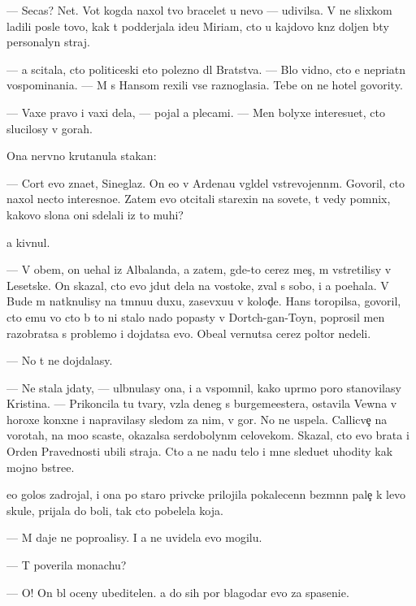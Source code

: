 \documentclass[10pt]{book}
\begin{document}
— Se{\y}cas? Net. Vot kogda naxol tvo{\y} bracelet u nevo — udivilsa. V{\yi} ne slixkom ladili posle tovo, kak t{\yi} podderjala ide{\y}u Miriam, cto u kajdovo kn{\ia}z{\ia} doljen b{\yi}ty personalyn{\yi}{\y} straj.

— {\Y}a scitala, cto politiceski eto polezno dl{\ia} Bratstva. — B{\yi}lo vidno, cto {\y}e{\y} nepri{\y}atn{\yi} vospominani{\y}a. — M{\yi} s Hansom rexili vse raznoglasi{\y}a. Tebe on ne hotel govority.

— Vaxe pravo i vaxi dela, — pojal {\y}a plecami. — Men{\ia} bolyxe interesu{\y}et, cto slucilosy v gorah.

Ona nervno krutanula stakan:

— Cort {\y}evo zna{\y}et, Sineglaz{\yi}{\y}. On {\y}e{\x}o v Ardenau v{\yi}gl{\ia}del vstrevojenn{\yi}m. Govoril, cto naxol necto interesno{\y}e. Zatem {\y}evo otcitali stare{\y}xin{\yi} na sovete, t{\yi} vedy pomnix, kakovo slona oni sdelali iz to{\y} muhi?

{\Y}a kivnul.

— V ob{\x}em, on u{\y}ehal iz Albalanda, a zatem, gde-to cerez mes{\ia}{\c}, m{\yi} vstretilisy v Lesetske. On skazal, cto {\y}evo jdut dela na vostoke, zval s sobo{\y}, i {\y}a po{\y}ehala. V Bude m{\yi} natknulisy na t{\e}mnu{\y}u duxu, zasevxu{\y}u v kolod{\c}e. Hans toropilsa, govoril, cto {\y}emu vo cto b{\yi} to ni stalo nado popasty v Dortch-gan-Toyn, poprosil men{\ia} razobratsa s problemo{\y} i dojdatsa {\y}evo. Obe{\x}al vernutsa cerez poltor{\yi} nedeli.

— No t{\yi} ne dojdalasy.

— Ne stala jdaty, — ul{\yi}bnulasy ona, i {\y}a vspomnil, kako{\y} upr{\ia}mo{\y} poro{\y} stanovilasy Kristina. — Prikoncila tu tvary, vz{\ia}la deneg s burgemeestera, ostavila Vewna v horoxe{\y} kon{\io}xne i napravilasy sledom za nim, v gor{\yi}. No ne uspela. Callicve{\c} na vorotah, na mo{\y}o scast{\y}e, okazalsa serdobolyn{\yi}m celovekom. Skazal, cto {\y}evo brat{\y}a i Orden Pravednosti ubili straja. Cto {\y}a ne na{\y}du telo i mne sledu{\y}et uhodity kak mojno b{\yi}stre{\y}e.

{\Y}e{\y}o golos zadrojal, i ona po staro{\y} priv{\yi}cke prilojila pokalecenn{\yi}{\y} bez{\yi}m{\ia}nn{\yi}{\y} pale{\c} k levo{\y} skule, prijala do boli, tak cto pobelela koja.

— M{\yi} daje ne popro{\x}alisy. I {\y}a ne uvidela {\y}evo mogilu.

— T{\yi} poverila monachu?

— O! On b{\yi}l oceny ubeditelen. {\Y}a do sih por blagodar{\io} {\y}evo za spaseni{\y}e.
\end{document}
